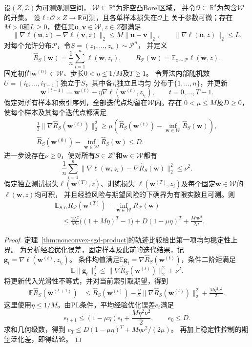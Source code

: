 \begin{theorem}[PL条件下非凸SGD的学习保证]
\label{thm:pl-stability-learning}
设$(Z,\mathcal Z)$为可测观测空间，
$\mathcal W\subseteq\mathbb R^d$为非空凸Borel区域，
并令$\mathcal O\subseteq\mathbb R^d$为包含$\mathcal W$的开集。
设$\ell:\mathcal O\times Z\to\mathbb R$可测，且各单样本损失在$\mathcal O$上
关于参数可微；存在$M>0$和$L\geq0$，使任意$\bm u,\bm v\in\mathcal W,z\in Z$都满足
\[
 \|\nabla\ell(\bm u,z)-\nabla\ell(\bm v,z)\|_2
 \leq M\|\bm u-\bm v\|_2,
 \qquad
 \|\nabla\ell(\bm u,z)\|_2\leq L.
\]
对每个允许分布$\mathcal P$，令$S=(z_1,\ldots,z_n)\sim\mathcal P^n$，
并定义
\[
 \hat R_S(\bm w)=\frac1n\sum_{i=1}^n\ell(\bm w,z_i),
 \qquad
 R_{\mathcal P}(\bm w)=\mathbb E_{z\sim\mathcal P}\ell(\bm w,z).
\]
固定初值$\bm w^{(0)}\in\mathcal W$、步长$0<\eta\leq1/M$及$T\geq1$。
令算法内部随机数$U=(i_0,\ldots,i_{T-1})$独立于$S$，其中各$i_t$独立且均匀
分布于$\{1,\ldots,n\}$，并更新
\[
 \bm w^{(t+1)}
 =\bm w^{(t)}-\eta\nabla\ell(\bm w^{(t)},z_{i_t}),
 \qquad t=0,\ldots,T-1.
\]
假定对所有样本和索引序列，全部迭代点均留在$\mathcal W$内。存在
$0<\mu\leq M$及$D\geq0$，使每个样本及其每个迭代点都满足
\[
\begin{aligned}
 \frac12\|\nabla\hat R_S(\bm w^{(t)})\|_2^2
 \geq\mu\!\left(
 \hat R_S(\bm w^{(t)})-\inf_{\bm w\in\mathcal W}\hat R_S(\bm w)\right),\\
 \hat R_S(\bm w^{(0)})-\inf_{\bm w\in\mathcal W}\hat R_S(\bm w)\leq D.
\end{aligned}
\]
进一步设存在$\nu\geq0$，使对所有$S\in Z^n$和$\bm w\in\mathcal W$都有
\[
 \frac1n\sum_{i=1}^n
 \|\nabla\ell(\bm w,z_i)-\nabla\hat R_S(\bm w)\|_2^2\leq\nu^2.
\]
假定独立测试损失$\ell(\bm w^{(T)},z)$、训练损失
$\ell(\bm w^{(T)},z_i)$及每个固定$\bm w\in\mathcal W$的$\ell(\bm w,z)$均可积，
并且经验风险与期望风险的下确界为有限实数且可测。则
\begin{align*}
 &\mathbb E_{S,U}R_{\mathcal P}(\bm w^{(T)})-
   \inf_{\bm w\in\mathcal W}R_{\mathcal P}(\bm w)\\
 &\quad\leq\frac{2L^2}{Mn}\bigl((1+M\eta)^T-1\bigr)
                  +D(1-\mu\eta)^T+\frac{M\eta\nu^2}{2\mu}.
\end{align*}
\end{theorem}
\begin{proof}
定理~\ref{thm:nonconvex-sgd-product}的轨迹比较给出第一项均匀稳定性上界。
为分析经验优化误差，固定样本及此前的迭代结果，记
$\bm g_t=\nabla\ell(\bm w^{(t)},z_{i_t})$。
条件均值满足$\mathbb E\bm g_t=\nabla\hat R_S(\bm w^{(t)})$，条件二阶矩满足
\[
 \mathbb E\|\bm g_t\|_2^2
 \leq\|\nabla\hat R_S(\bm w^{(t)})\|_2^2+\nu^2.
\]
将更新代入光滑性不等式，并对当前索引取期望，得到
\begin{align*}
 \mathbb E\hat R_S(\bm w^{(t+1)})
 &\leq\hat R_S(\bm w^{(t)})
 -\frac\eta2\|\nabla\hat R_S(\bm w^{(t)})\|_2^2
 +\frac{M\eta^2\nu^2}{2}.
\end{align*}
这里使用$\eta\leq1/M$。由PL条件，平均经验优化误差$e_t$满足
\[
 e_{t+1}\leq(1-\mu\eta)e_t+\frac{M\eta^2\nu^2}{2},
 \qquad e_0\leq D.
\]
求和几何级数，得到
$e_T\leq D(1-\mu\eta)^T+M\eta\nu^2/(2\mu)$。
再加上稳定性控制的期望泛化差，即得结论。
\end{proof}

